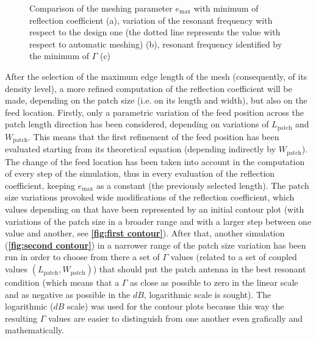 \documentclass[10 pt,a4paper,twocolumn]{article}
\begin{document}
{\begin{figure}[bt!]
\begin{subfigure}[t]{0.32\linewidth}
		\caption{}
		\label{eq:Df vs mesh}
	\end{subfigure}
	\hfill
	\begin{subfigure}[t]{0.32\linewidth}
		\def\svgwidth{\linewidth}
		\tiny{}
		
		\caption{}
		\label{eq:f vs mesh}
	\end{subfigure}
	\hfill
	\caption{Comparison of the meshing parameter $e_{\max}$ with minimum of reflection coefficient (a), variation of the resonant frequency with respect to the design one (the dotted line represents the value with respect to automatic meshing) (b), resonant frequency identified by the minimum of $\Gamma$ (c)} 
\end{figure}
After the selection of the maximum edge length of the mesh (consequently, of its density level), a more refined computation of the reflection coefficient will be made, depending on the patch size (i.e. on its length and width), but also on the feed location. Firstly, only a parametric variation of the feed position across the patch length direction has been considered, depending on variations of $L_{\operatorname{patch}}$ and $W_{\operatorname{patch}}$. This means that the first refinement of the feed position has been evaluated starting from its theoretical equation (depending indirectly by $W_{\operatorname{patch}}$). The change of the feed location has been taken into account in the computation of every step of the simulation, thus in every evaluation of the reflection coefficient, keeping $e_{\max}$ as a constant (the previously selected length). The patch size variations provoked wide modifications of the reflection coefficient, which values depending on that have been represented by an initial contour plot (with variations of the patch size in a broader range and with a larger step between one value and another, see \textbf{\cref{fig:first contour}}). After that, another simulation (\textbf{\cref{fig:second contour}}) in a narrower range of the patch size variation has been run in order to choose from there a set of $\Gamma$ values (related to a set of coupled values $(L_{\operatorname{patch}},W_{\operatorname{patch}})$) that should put the patch antenna in the best resonant condition (which means that a $\Gamma$ as close as possible to zero in the linear scale and as negative as possible in the $dB$, logarithmic scale is sought). The logarithmic ($dB$ scale) was used for the contour plots because this way the resulting $\Gamma$ values are easier to distinguish from one another even grafically and mathematically. 


}
\end{document}
